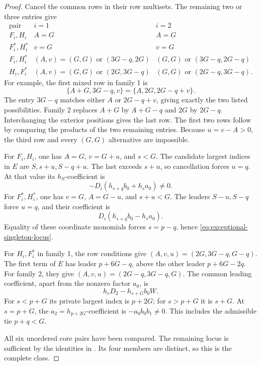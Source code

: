 \documentclass[11pt,a4paper]{amsart}
\numberwithin{equation}{section}
\theoremstyle{plain}
\theoremstyle{definition}
\begin{document}
\begin{proof}
Cancel the common rows in their row multisets.  The remaining two or
three entries give
\begin{equation}\label{eq:exceptional-context-rows}
 \begin{array}{c|c|c}
 \text{pair}&i=1&i=2\\\hline
 F_i,H_i&A=G&A=G\\
 F_i^*,H_i^*&v=G&v=G\\
 F_i,H_i^*&(A,v)=(G,G)\text{ or }(3G-q,2G)
          &(G,G)\text{ or }(3G-q,2G-q)\\
 H_i,F_i^*&(A,v)=(G,G)\text{ or }(2G,3G-q)
          &(G,G)\text{ or }(2G-q,3G-q).
 \end{array}
\end{equation}
For example, the first mixed row in family 1 is
\[
 \{A+G,3G-q,v\}=\{A,2G,2G-q+v\}.
\]
The entry \(3G-q\) matches either \(A\) or \(2G-q+v\), giving
exactly the two listed possibilities.  Family 2 replaces \(A+G\) by
\(A+G-q\) and \(2G\) by \(2G-q\).  Interchanging the exterior
positions gives the last row.  The first two rows follow by comparing
the products of the two remaining entries.
Because \(u=v-A>0\), the third row and every \((G,G)\) alternative
are impossible.

For \(F_i,H_i\), one has \(A=G\), \(v=G+u\), and \(s<G\).
The candidate largest indices in \(E\) are \(S,s+u,S-q+u\).
The last exceeds \(s+u\), so cancellation forces \(u=q\).
At that value its \(h_S\)-coefficient is
\[
 -D_i(h_{s+q}b_0+h_sa_0)\ne0.
\]
For \(F_i^*,H_i^*\), one has \(v=G\), \(A=G-u\), and
\(s+u<G\).  The leaders \(S-u,S-q\) force \(u=q\), and their
coefficient is
\[
 D_i(h_{s+q}b_0-h_sa_0).
\]
Equality of these coordinate monomials forces \(s=p-q\), hence
\eqref{eq:exceptional-singleton-locus}.

For \(H_i,F_i^*\) in family 1, the row conditions give
\((A,v,u)=(2G,3G-q,G-q)\).  The first term of \(E\) has leader
\(p+6G-q\), above the other leader \(p+6G-2q\).
For family 2, they give \((A,v,u)=(2G-q,3G-q,G)\).
The common leading coefficient, apart from the nonzero factor \(a_0\), is
\[
 h_sD_2-h_{s+G}b_0W.
\]
For \(s<p+G\) its private largest index is \(p+2G\); for
\(s>p+G\) it is \(s+G\).  At \(s=p+G\), the
\(a_2=h_{p+2G}\)-coefficient is \(-a_0b_0b_1\ne0\).
This includes the admissible tie \(p+q<G\).

All six unordered core pairs have been compared.  The remaining locus
is sufficient by the identities in .
Its four members are distinct, so this is the complete class.
\end{proof}
\end{document}
